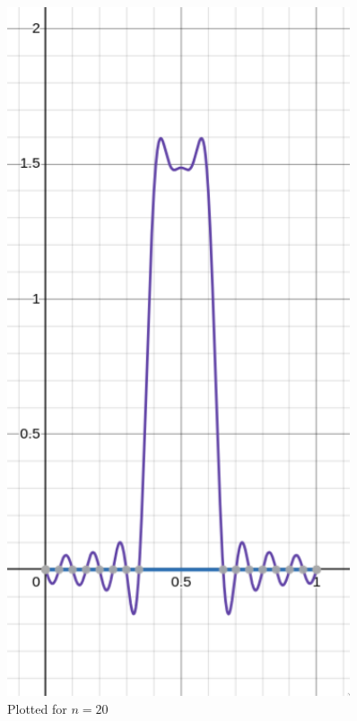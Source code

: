 \documentclass[letter]{article}
\begin{document}
\begin{minipage}{0.3\textwidth}
	\begin{figure}[H]
		\centering
		\includegraphics[width=0.9\textwidth]{ss/speed02.png}
		\caption{Plotted for $n = 20$}
		\label{fig:kdkdk}
	\end{figure}	
\end{minipage}
\hfill 
\end{document}

